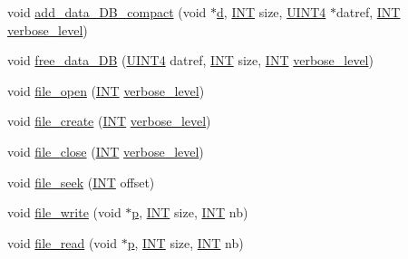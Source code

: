\begin{DoxyCompactItemize}
\item 
void \mbox{\hyperlink{classdatabase_a31e32de1b8d81c97549b8c74ea678904}{add\+\_\+data\+\_\+\+D\+B\+\_\+compact}} (void $\ast$\mbox{\hyperlink{simeon_8_c_a4339ca06fa882e69473d37bd6d7917d1}{d}}, \mbox{\hyperlink{galois_8h_a09fddde158a3a20bd2dcadb609de11dc}{I\+NT}} size, \mbox{\hyperlink{galois_8h_ac94af6544c710549c9fca744fd510395}{U\+I\+N\+T4}} $\ast$datref, \mbox{\hyperlink{galois_8h_a09fddde158a3a20bd2dcadb609de11dc}{I\+NT}} \mbox{\hyperlink{simeon_8_c_a818073fbcc2f439e7c56952f67386122}{verbose\+\_\+level}})
\item 
void \mbox{\hyperlink{classdatabase_a45b6fb10b6810c9770748e7f9dda8377}{free\+\_\+data\+\_\+\+DB}} (\mbox{\hyperlink{galois_8h_ac94af6544c710549c9fca744fd510395}{U\+I\+N\+T4}} datref, \mbox{\hyperlink{galois_8h_a09fddde158a3a20bd2dcadb609de11dc}{I\+NT}} size, \mbox{\hyperlink{galois_8h_a09fddde158a3a20bd2dcadb609de11dc}{I\+NT}} \mbox{\hyperlink{simeon_8_c_a818073fbcc2f439e7c56952f67386122}{verbose\+\_\+level}})
\item 
void \mbox{\hyperlink{classdatabase_a33494febd887d058f862ef6001d4a044}{file\+\_\+open}} (\mbox{\hyperlink{galois_8h_a09fddde158a3a20bd2dcadb609de11dc}{I\+NT}} \mbox{\hyperlink{simeon_8_c_a818073fbcc2f439e7c56952f67386122}{verbose\+\_\+level}})
\item 
void \mbox{\hyperlink{classdatabase_afffc9413d00af2e69d9852773a2eb344}{file\+\_\+create}} (\mbox{\hyperlink{galois_8h_a09fddde158a3a20bd2dcadb609de11dc}{I\+NT}} \mbox{\hyperlink{simeon_8_c_a818073fbcc2f439e7c56952f67386122}{verbose\+\_\+level}})
\item 
void \mbox{\hyperlink{classdatabase_a2c40bcffaf69fb166b6ac1bafee50baf}{file\+\_\+close}} (\mbox{\hyperlink{galois_8h_a09fddde158a3a20bd2dcadb609de11dc}{I\+NT}} \mbox{\hyperlink{simeon_8_c_a818073fbcc2f439e7c56952f67386122}{verbose\+\_\+level}})
\item 
void \mbox{\hyperlink{classdatabase_a67ff377651f4ac089241ebff60e17ed6}{file\+\_\+seek}} (\mbox{\hyperlink{galois_8h_a09fddde158a3a20bd2dcadb609de11dc}{I\+NT}} offset)
\item 
void \mbox{\hyperlink{classdatabase_a42d32ba51ad8ccd2a0adfd1a147f6230}{file\+\_\+write}} (void $\ast$\mbox{\hyperlink{alphabet2_8_c_a533391314665d6bf1b5575e9a9cd8552}{p}}, \mbox{\hyperlink{galois_8h_a09fddde158a3a20bd2dcadb609de11dc}{I\+NT}} size, \mbox{\hyperlink{galois_8h_a09fddde158a3a20bd2dcadb609de11dc}{I\+NT}} nb)
\item 
void \mbox{\hyperlink{classdatabase_ac743549af82d694be57c5a120987ed37}{file\+\_\+read}} (void $\ast$\mbox{\hyperlink{alphabet2_8_c_a533391314665d6bf1b5575e9a9cd8552}{p}}, \mbox{\hyperlink{galois_8h_a09fddde158a3a20bd2dcadb609de11dc}{I\+NT}} size, \mbox{\hyperlink{galois_8h_a09fddde158a3a20bd2dcadb609de11dc}{I\+NT}} nb)
\end{DoxyCompactItemize}
